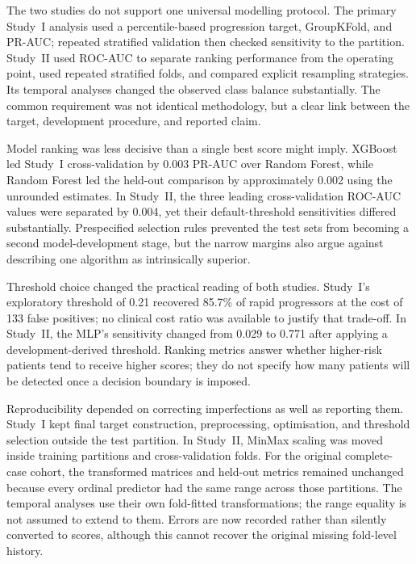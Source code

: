 The two studies do not support one universal modelling protocol. The primary Study~I analysis used a percentile-based progression target, GroupKFold, and \gls{PR-AUC}; repeated stratified validation then checked sensitivity to the partition. Study~II used \gls{ROC-AUC} to separate ranking performance from the operating point, used repeated stratified folds, and compared explicit resampling strategies. Its temporal analyses changed the observed class balance substantially. The common requirement was not identical methodology, but a clear link between the target, development procedure, and reported claim.

Model ranking was less decisive than a single best score might imply. XGBoost led Study~I cross-validation by 0.003 \gls{PR-AUC} over Random Forest, while Random Forest led the held-out comparison by approximately 0.002 using the unrounded estimates. In Study~II, the three leading cross-validation \gls{ROC-AUC} values were separated by 0.004, yet their default-threshold sensitivities differed substantially. Prespecified selection rules prevented the test sets from becoming a second model-development stage, but the narrow margins also argue against describing one algorithm as intrinsically superior.

Threshold choice changed the practical reading of both studies. Study~I's exploratory threshold of 0.21 recovered 85.7\% of rapid progressors at the cost of 133 false positives; no clinical cost ratio was available to justify that trade-off. In Study~II, the MLP's sensitivity changed from 0.029 to 0.771 after applying a development-derived threshold. Ranking metrics answer whether higher-risk patients tend to receive higher scores; they do not specify how many patients will be detected once a decision boundary is imposed.

Reproducibility depended on correcting imperfections as well as reporting them. Study~I kept final target construction, preprocessing, optimisation, and threshold selection outside the test partition. In Study~II, MinMax scaling was moved inside training partitions and cross-validation folds. For the original complete-case cohort, the transformed matrices and held-out metrics remained unchanged because every ordinal predictor had the same range across those partitions. The temporal analyses use their own fold-fitted transformations; the range equality is not assumed to extend to them. Errors are now recorded rather than silently converted to scores, although this cannot recover the original missing fold-level history.

